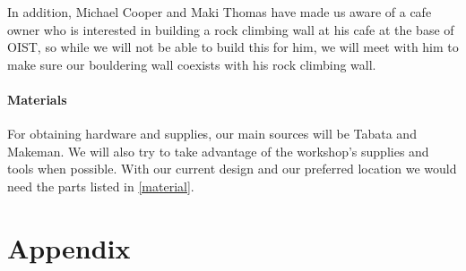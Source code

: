 \documentclass[a4paper, 12pt]{scrartcl}
\begin{document}
In addition, Michael Cooper and Maki Thomas have made us aware of a cafe owner who is interested in building a rock climbing wall at his cafe at the base of OIST, so while we will not be able to build this for him, we will meet with him to make sure our bouldering wall coexists with his rock climbing wall.

\paragraph{Materials}
For obtaining hardware and supplies, our main sources will be Tabata and Makeman. We will also try to take advantage of the workshop's supplies and tools when possible. With our current design and our preferred location we would need the parts listed in \cref{material}.

\newpage
\section*{Appendix}
\begin{figure}[ht]
\end{figure}
\end{document}
